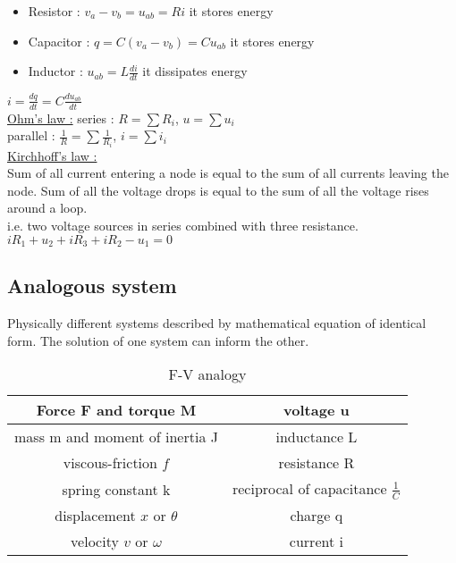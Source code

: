 \documentclass[../main.tex]{subfiles}
\begin{document}
\begin{itemize}
    \item Resistor : $v_a-v_b = u_{ab} = Ri$ it stores energy\\
    \item Capacitor : $q=C(v_a-v_b) = Cu_{ab}$ it stores energy\\
    \item Inductor : $u_{ab} = L\frac{di}{dt}$ it dissipates energy\\
\end{itemize}

$i = \frac{dq}{dt} = C \frac{du_{ab}}{dt}$\\

\quad \underline{Ohm's law :} series : $R = \sum R_i$, $u=\sum u_i$\\
parallel : $\frac{1}{R} = \sum \frac{1}{R_i}$, $i = \sum i_i$\\

\quad \underline{Kirchhoff's law :}\\
Sum of all current entering a node is equal to the sum of all currents leaving the node. Sum of all the voltage drops is equal to the sum of all the voltage rises around a loop.\\

i.e. two voltage sources in series combined with three resistance.\\
$iR_1 + u_2 + iR_3 + iR_2 - u_1 = 0$\\

\subsection{Analogous system}
Physically different systems described by mathematical equation of identical form. The solution of one system can inform the other.\\

\begin{table}[hbt!]
    \centering
    \begin{tabular}{c|c}
        Force F and torque M & voltage u \\
        \hline
        mass m and moment of inertia J & inductance L\\
        \hline
        viscous-friction $f$& resistance R\\
        \hline
        spring constant k & reciprocal of capacitance $\frac{1}{C}$\\
        \hline
        displacement $x$ or $\theta$ & charge q\\
        \hline
        velocity $v$ or $\omega$ & current i\\
    \end{tabular}
    \caption{F-V analogy}
\end{table}
\end{document}
